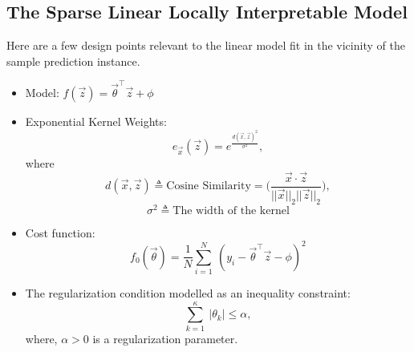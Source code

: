 \documentclass{article}
\begin{document}
\subsection{The Sparse Linear Locally Interpretable Model}
Here are a few design points relevant to the linear model fit in the vicinity of the sample prediction instance.
\begin{itemize}
    \item Model: $f(\vec{z}) = \vec{\theta}^\intercal \vec{z} + \phi$
    \item Exponential Kernel Weights:
    \begin{equation}\label{1}
        e_{\vec{x}}(\vec{z}) = e^{\frac{d(\vec{x}, \vec{z})^2}{\sigma^2}},
    \end{equation}
    where
    \begin{equation}\label{2}
        d(\vec{x}, \vec{z}) \triangleq \text{Cosine Similarity} = \Big(\frac{\vec{x} \cdot \vec{z}}{||\vec{x}||_2 ||\vec{z}||_2}\Big),
    \end{equation}
    \[\sigma^2 \triangleq \text{The width of the kernel}\]
    \item Cost function:
    \begin{equation}\label{3}
        f_0(\vec{\theta}) = \frac{1}{N} \sum_{i=1}^N\ (y_i - \vec{\theta}^\intercal \vec{z} - \phi)^2
    \end{equation}
    \item The regularization condition modelled as an inequality constraint:
    \begin{equation}\label{4}
        \sum_{k=1}^{\kappa}\ |\theta_k| \leq \alpha,
    \end{equation}
    where, $\alpha > 0$ is a regularization parameter.
\end{itemize}
\end{document}
